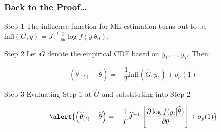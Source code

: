 \begin{frame}
  \frametitle{Back to the Proof\dots}
 

  \begin{block}{Step 1}
    The influence function for ML estimation turns out to be $\text{infl}(G,y) = J^{-1} \frac{\partial}{\partial \theta}\log f(y|\theta_0)$.
  \end{block}

  \pause

  \begin{block}{Step 2}
    Let $\widehat{G}$ denote the empirical CDF based on $y_1, \dots, y_T$. Then:
    \vspace{-1em}

   \[
     \left( \widehat{\theta}_{(t)} - \widehat{\theta} \right) = -\frac{1}{T} \text{infl}(\widehat{G}, y_t) + o_p(1)
   \]
  \end{block}

  \pause

  \vspace{-2em}

  \begin{block}{Step 3}
    Evaluating Step 1 at $\widehat{G}$ and substituting into Step 2

    \vspace{-1em}

\[
  \alert{\left( \widehat{\theta}_{(t)} - \widehat{\theta}  \right) = -\frac{1}{T} \widehat{J}^{-1} \left[\frac{\partial \log f(y_t|\widehat{\theta})}{\partial \theta}\right] + o_p(1)}
\]
  \end{block}

\end{frame}
